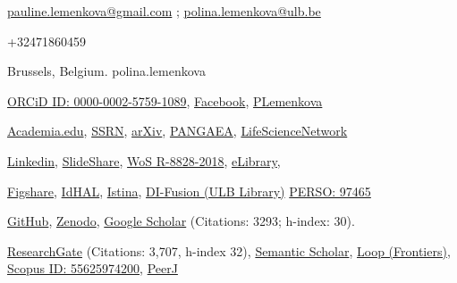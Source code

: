 \documentclass[10pt]{article}
\newenvironment{innerlist}[1][\enskip\textbullet]%
        {\begin{compactitem}[#1]}{\end{compactitem}}
\providecommand*\email[1]{\href{mailto:#1}{#1}}
\begin{document}
\begin{innerlist}
	\item[\Letter] \email{pauline.lemenkova@gmail.com} ; \email{polina.lemenkova@ulb.be} 
	\item[\phone] +32471860459
	\item[\faHome] Brussels, Belgium. \faSkype \space polina.lemenkova
	\item[\textcolor{orcidlogocol}{\aiOrcid}] \href{https://orcid.org/0000-0002-5759-1089}{ORCiD ID: 0000-0002-5759-1089},  \faFacebookSquare \space\href{https://www.facebook.com/polina.lemenkova.7}{Facebook}, \faTwitter \space \href{https://twitter.com/PLemenkova}{PLemenkova}%
	\item[\aiAcademia] \href{https://ulb.academia.edu/PolinaLemenkova}{Academia.edu}, \href{https://ssrn.com/author=3266317}{SSRN}, \aiarXiv \space\href{https://arxiv.org/a/lemenkova_p_1.html}{arXiv}, \href{https://doi.pangaea.de/10.1594/PANGAEA.680792}{PANGAEA}, \href{https://www.lifescience.net/profile/polina-lemenkova-9skfemem/}{LifeScienceNetwork}
	\item[\faLinkedin] \href{https://www.linkedin.com/in/paulinelemenkova}{Linkedin}, \faSlideshare\space \href{https://www.slideshare.net/PolinaLemenkova/presentations}{SlideShare}, \href{https://www.webofscience.com/wos/author/rid/R-8828-2018}{WoS R-8828-2018}, \href{https://elibrary.ru/author_items.asp?authorid=153168}{eLibrary}, 
	\item[\aiFigshare] \href{https://figshare.com/authors/Polina_Lemenkova/5855411}{Figshare}, \href{https://cv.archives-ouvertes.fr/polina-lemenkova}{IdHAL}, \href{http://istina.msu.ru/profile/polinalemenkova/}{Istina}, \href{https://difusion.ulb.ac.be/vufind/Author/Home?author=Lemenkova, Polina}{DI-Fusion (ULB Library)} \href{https://difusion.ulb.ac.be/vufind/services/MyResearch/GetListPubsORCID.php?id=97465&lf=Polina Lemenkova&language=en}{PERSO: 97465}
	\item[\faGithub] \href{https://github.com/paulinelemenkova}{GitHub}, \href{https://zenodo.org/search?page=1&size=20&q=lemenkova}{Zenodo}, \aiGoogleScholar\space \href{https://scholar.google.com/citations?user=As7apVQAAAAJ&hl=en}{Google Scholar} (Citations: 3293; h-index: 30). 
	\item[\aiResearchGate] \href{https://www.researchgate.net/profile/Polina-Lemenkova-2}{ResearchGate} (Citations: 3,707, h-index 32), \aiSemanticScholar \space \href{https://www.semanticscholar.org/author/Polina-Lemenkova/52194775}{Semantic Scholar}, \href{https://loop.frontiersin.org/people/624535/overview}{Loop (Frontiers)}, \href{https://www.scopus.com/authid/detail.uri?authorId=55625974200}{Scopus ID: 55625974200}, \href{https://peerj.com/polinalemenkova/}{PeerJ}

\end{innerlist}
\end{document}
